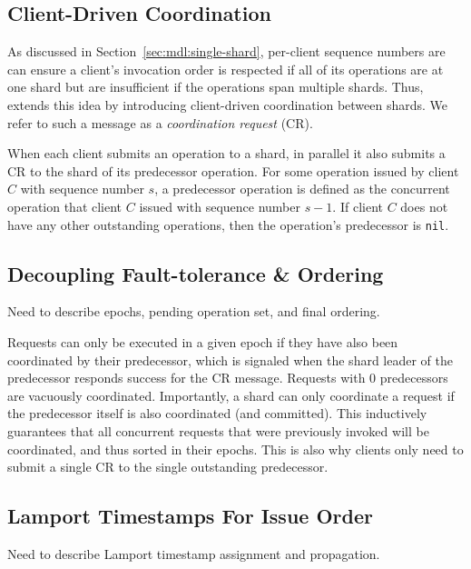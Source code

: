 \subsection{Client-Driven Coordination}

As discussed in Section~\ref{sec:mdl:single-shard}, per-client sequence numbers are
can ensure a client's invocation order is respected if all of its operations are at
one shard but are insufficient if the operations span multiple shards. Thus, \sys{}
extends this idea by introducing client-driven coordination between shards. We
refer to such a message as a \textit{coordination request} (CR).

When each client submits an operation to a shard, in parallel it also submits a CR
to  the shard of its predecessor operation. For some operation issued by client $C$
with sequence number $s$, a predecessor operation is defined as the concurrent
operation that client $C$ issued with sequence number $s-1$. If client $C$ does not
have any other outstanding operations, then the operation's predecessor is
\texttt{nil}.

\subsection{Decoupling Fault-tolerance \& Ordering}

Need to describe epochs, pending operation set, and final ordering.

Requests can only be executed in a given epoch if they have also been coordinated by their predecessor, which is signaled when the shard
leader of the predecessor responds success for the CR message. Requests with 0 predecessors are vacuously coordinated. Importantly, a shard can only coordinate
a request if the predecessor itself is also coordinated (and committed). This inductively guarantees that all concurrent requests that were previously invoked
will be coordinated, and thus sorted in their epochs. This is also why clients only need to submit a single CR to the single outstanding predecessor.

\subsection{Lamport Timestamps For Issue Order}

Need to describe Lamport timestamp assignment and propagation.


